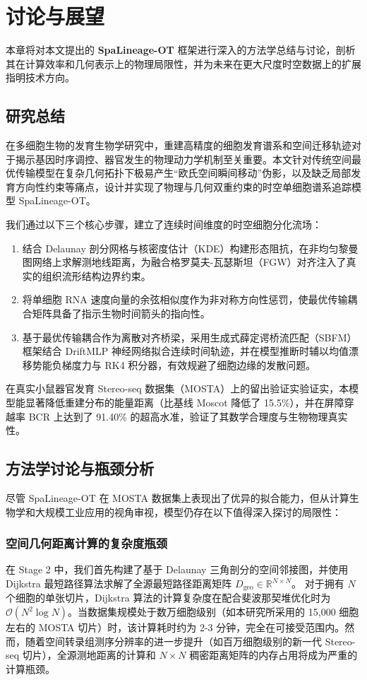 
\chapter{讨论与展望}
\label{ch:discussion}

本章将对本文提出的 \textbf{SpaLineage-OT} 框架进行深入的方法学总结与讨论，剖析其在计算效率和几何表示上的物理局限性，并为未来在更大尺度时空数据上的扩展指明技术方向。

\section{研究总结}
在多细胞生物的发育生物学研究中，重建高精度的细胞发育谱系和空间迁移轨迹对于揭示基因时序调控、器官发生的物理动力学机制至关重要。本文针对传统空间最优传输模型在复杂几何拓扑下极易产生“欧氏空间瞬间移动”伪影，以及缺乏局部发育方向性约束等痛点，设计并实现了物理与几何双重约束的时空单细胞谱系追踪模型 SpaLineage-OT。

我们通过以下三个核心步骤，建立了连续时间维度的时空细胞分化流场：
\begin{enumerate}
    \item 结合 Delaunay 剖分网格与核密度估计（KDE）构建形态阻抗，在非均匀黎曼图网络上求解测地线距离，为融合格罗莫夫-瓦瑟斯坦（FGW）对齐注入了真实的组织流形结构边界约束。
    \item 将单细胞 RNA 速度向量的余弦相似度作为非对称方向性惩罚，使最优传输耦合矩阵具备了指示生物时间箭头的指向性。
    \item 基于最优传输耦合作为离散对齐桥梁，采用生成式薛定谔桥流匹配（SBFM）框架结合 DriftMLP 神经网络拟合连续时间轨迹，并在模型推断时辅以均值漂移势能负梯度力与 RK4 积分器，有效规避了细胞边缘的发散问题。
\end{enumerate}
在真实小鼠器官发育 Stereo-seq 数据集（MOSTA）上的留出验证实验证实，本模型能显著降低重建分布的能量距离（比基线 Moscot 降低了 15.5\%），并在屏障穿越率 BCR 上达到了 91.40\% 的超高水准，验证了其数学合理度与生物物理真实性。

\section{方法学讨论与瓶颈分析}
尽管 SpaLineage-OT 在 MOSTA 数据集上表现出了优异的拟合能力，但从计算生物学和大规模工业应用的视角审视，模型仍存在以下值得深入探讨的局限性：

\subsection{空间几何距离计算的复杂度瓶颈}
在 Stage 2 中，我们首先构建了基于 Delaunay 三角剖分的空间邻接图，并使用 Dijkstra 最短路径算法求解了全源最短路径距离矩阵 $D_{\text{geo}} \in \mathbb{R}^{N \times N}$。
对于拥有 $N$ 个细胞的单张切片，Dijkstra 算法的计算复杂度在配合斐波那契堆优化时为 $\mathcal{O}(N^2 \log N)$。当数据集规模处于数万细胞级别（如本研究所采用的 15,000 细胞左右的 MOSTA 切片）时，该计算耗时约为 2-3 分钟，完全在可接受范围内。然而，随着空间转录组测序分辨率的进一步提升（如百万细胞级别的新一代 Stereo-seq 切片），全源测地距离的计算和 $N \times N$ 稠密距离矩阵的内存占用将成为严重的计算瓶颈。

